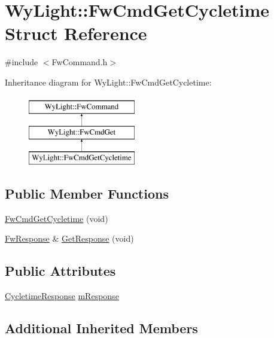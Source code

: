 \hypertarget{struct_wy_light_1_1_fw_cmd_get_cycletime}{\section{Wy\-Light\-:\-:Fw\-Cmd\-Get\-Cycletime Struct Reference}
\label{struct_wy_light_1_1_fw_cmd_get_cycletime}
}


{\ttfamily \#include $<$Fw\-Command.\-h$>$}

Inheritance diagram for Wy\-Light\-:\-:Fw\-Cmd\-Get\-Cycletime\-:\begin{figure}[H]
\begin{center}
\leavevmode
\includegraphics[height=3.000000cm]{struct_wy_light_1_1_fw_cmd_get_cycletime}
\end{center}
\end{figure}
\subsection*{Public Member Functions}
\begin{DoxyCompactItemize}
\item 
\hyperlink{struct_wy_light_1_1_fw_cmd_get_cycletime_a3ef62336a758f30f4e9c07cff7907b97}{Fw\-Cmd\-Get\-Cycletime} (void)
\item 
\hyperlink{class_wy_light_1_1_fw_response}{Fw\-Response} \& \hyperlink{struct_wy_light_1_1_fw_cmd_get_cycletime_aa6b457bdab92b36b2e16f88868e78beb}{Get\-Response} (void)
\end{DoxyCompactItemize}
\subsection*{Public Attributes}
\begin{DoxyCompactItemize}
\item 
\hyperlink{class_wy_light_1_1_cycletime_response}{Cycletime\-Response} \hyperlink{struct_wy_light_1_1_fw_cmd_get_cycletime_aee08eb755ea6f308d9ce9cd78adc9517}{m\-Response}
\end{DoxyCompactItemize}
\subsection*{Additional Inherited Members}


